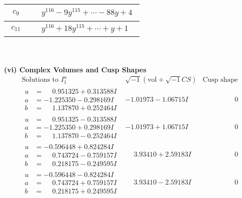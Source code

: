 \documentclass[1p]{elsarticle_modified}
\theoremstyle{definition}
\newcommand{\I}{\sqrt{-1}}
\begin{document}
\begin{tabular}{m{50pt}|m{274pt}}
\hline $$\begin{aligned}c_{9}\end{aligned}$$&$\begin{aligned}
&y^{116}-9 y^{115}+\cdots-88 y+4
\end{aligned}$\\
\hline $$\begin{aligned}c_{11}\end{aligned}$$&$\begin{aligned}
&y^{116}+18 y^{115}+\cdots+y+1
\end{aligned}$\\
\hline
\end{tabular}\\~\\
\newpage\flushleft \textbf{(vi) Complex Volumes and Cusp Shapes}
$$\begin{array}{c|c|c}  
\text{Solutions to }I^u_{1}& \I (\text{vol} + \sqrt{-1}CS) & \text{Cusp shape}\\
 \hline 
\begin{aligned}
u &= \phantom{-}0.951325 + 0.313588 I \\
a &= -1.225350 - 0.298169 I \\
b &= \phantom{-}1.137870 + 0.252464 I\end{aligned}
 & -1.01973 - 1.06715 I & \phantom{-0.000000 } 0 \\ \hline\begin{aligned}
u &= \phantom{-}0.951325 - 0.313588 I \\
a &= -1.225350 + 0.298169 I \\
b &= \phantom{-}1.137870 - 0.252464 I\end{aligned}
 & -1.01973 + 1.06715 I & \phantom{-0.000000 } 0 \\ \hline\begin{aligned}
u &= -0.596448 + 0.824284 I \\
a &= \phantom{-}0.743724 - 0.759157 I \\
b &= \phantom{-}0.218175 - 0.249595 I\end{aligned}
 & \phantom{-}3.93410 + 2.59183 I & \phantom{-0.000000 } 0 \\ \hline\begin{aligned}
u &= -0.596448 - 0.824284 I \\
a &= \phantom{-}0.743724 + 0.759157 I \\
b &= \phantom{-}0.218175 + 0.249595 I\end{aligned}
 & \phantom{-}3.93410 - 2.59183 I & \phantom{-0.000000 } 0 \\ \hline\begin{aligned}

\end{aligned}
\end{array}$$
\end{document}
